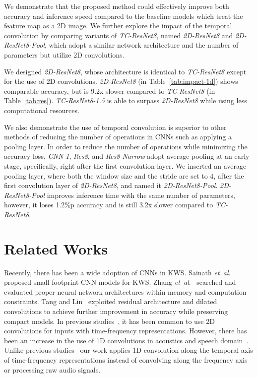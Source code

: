 \documentclass[a4paper]{article}
\begin{document}
We demonstrate that the proposed method could effectively improve both accuracy and inference speed compared to the baseline models which treat the feature map as a 2D image.
We further explore the impact of the temporal convolution by comparing variants of \emph{TC-ResNet8}, named \emph{2D-ResNet8} and \emph{2D-ResNet8-Pool}, which adopt a similar network architecture and the number of parameters but utilize 2D convolutions.

We designed \emph{2D-ResNet8}, whose architecture is identical to \emph{TC-ResNet8} except for the use of  2D convolutions.
\emph{2D-ResNet8} (in Table~\ref{tab:impact-1d}) shows comparable accuracy, but is 9.2x slower compared to \emph{TC-ResNet8} (in Table~\ref{tab:res}).
\emph{TC-ResNet8-1.5} is able to surpass \emph{2D-ResNet8} while using less computational resources.


We also demonstrate the use of temporal convolution is superior to other methods of reducing the number of operations in CNNs such as applying a pooling layer.
In order to reduce the number of operations while minimizing the accuracy loss, \emph{CNN-1}, \emph{Res8}, and \emph{Res8-Narrow} adopt average pooling at an early stage, specifically, right after the first convolution layer.
We inserted an average pooling layer, where both the window size and the stride are set to 4, after the first convolution layer of \emph{2D-ResNet8}, and named it \emph{2D-ResNet8-Pool}.
\emph{2D-ResNet8-Pool} improves inference time with the same number of parameters, however, it loses 1.2\%p accuracy and is still 3.2x slower compared to \emph{TC-ResNet8}.





\section{Related Works} \label{section:relatedwork}

Recently, there has been a wide adoption of CNNs in KWS.
Sainath \emph{et~al}.~\cite{sainath-interspeech-2015-cnn} proposed small-footprint CNN models for KWS.
Zhang \emph{et~al}.~\cite{zhang-arxiv-2017-helloedge} searched and evaluated proper neural network architectures within memory and computation constraints.
Tang and Lin~\cite{tang-icassp-2018-residual} exploited residual architecture and dilated convolutions to achieve further improvement in accuracy while preserving compact models.
In previous studies~\cite{sainath-interspeech-2015-cnn, zhang-arxiv-2017-helloedge, tang-icassp-2018-residual}, it has been common to use 2D convolutions for inputs with time-frequency representations.
However, there has been an increase in the use of 1D convolutions in acoustics and speech domain~\cite{lim-dcase-2017-rare, choi-icassp-2017-music}.
Unlike previous studies~\cite{lim-dcase-2017-rare, choi-icassp-2017-music} our work applies 1D convolution along the temporal axis of time-frequency representations instead of convolving along the frequency axis or processing raw audio signals.
\end{document}
